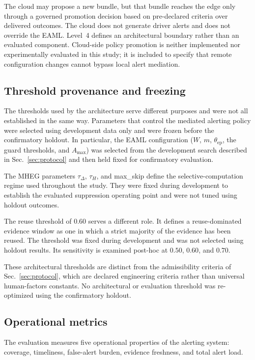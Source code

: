 \documentclass[conference]{IEEEtran}
\begin{document}
The cloud may propose a new bundle, but that bundle reaches the edge only
through a governed promotion decision based on pre-declared criteria over
delivered outcomes. The cloud does not generate driver alerts and does not
override the EAML. Level~4 defines an architectural boundary rather
than an evaluated component. Cloud-side policy promotion is neither
implemented nor experimentally evaluated in this study; it is included
to specify that remote configuration changes cannot bypass local alert
mediation.

\subsection{Threshold provenance and freezing}

The thresholds used by the architecture serve different purposes and
were not all established in the same way. Parameters that control the
mediated alerting policy were selected using development data only and
were frozen before the confirmatory holdout. In particular, the EAML
configuration ($W$, $m$, $\theta_{\mathrm{ep}}$, the guard thresholds,
and $A_{\max}$) was selected from the development search described in
Sec.~\ref{sec:protocol} and then held fixed for confirmatory evaluation.

The MHEG parameters $\tau_\Delta$, $\tau_H$, and max\_skip define the
selective-computation regime used throughout the study. They were fixed
during development to establish the evaluated suppression operating point
and were not tuned using holdout outcomes.

The reuse threshold of $0.60$ serves a different role. It defines a
reuse-dominated evidence window as one in which a strict majority of the
evidence has been reused. The threshold was fixed during development and
was not selected using holdout results. Its sensitivity is examined
post-hoc at $0.50$, $0.60$, and $0.70$.

These architectural thresholds are distinct from the admissibility
criteria of Sec.~\ref{sec:protocol}, which are declared engineering
criteria rather than universal human-factors constants. No
architectural or evaluation threshold was re-optimized using the
confirmatory holdout.

\subsection{Operational metrics}

The evaluation measures five operational properties of the alerting
system: coverage, timeliness, false-alert burden, evidence freshness, and
total alert load.
\end{document}
